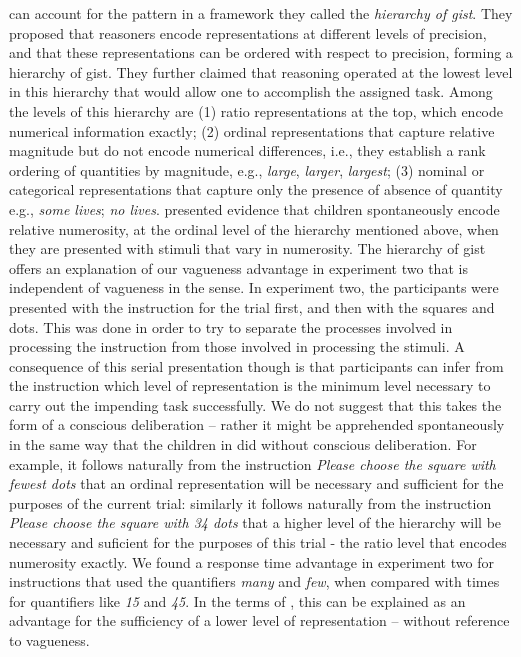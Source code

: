 \documentclass[doc,floatmark]{apa}
\begin{document}
\begin{seriate}
\item {} can account for the pattern in a framework they called the \emph{hierarchy of gist}. They proposed that reasoners encode representations at different levels of precision, and that these representations can be ordered with respect to precision, forming a hierarchy of gist. They further claimed that reasoning operated at the lowest level in this hierarchy that would allow one to accomplish the assigned task. Among the levels of this hierarchy are  (1) ratio representations at the top, which encode numerical information exactly; (2) ordinal representations that capture relative magnitude but do not encode numerical differences, i.e., they establish a rank ordering of quantities by magnitude, e.g., \emph{large}, \emph{larger}, \emph{largest}; (3) nominal or categorical representations that capture only the presence of absence of quantity e.g., \emph{some lives}; \emph{no lives}.  presented evidence that children spontaneously encode relative numerosity, at the ordinal level of the hierarchy mentioned above, when they are presented with stimuli that vary in numerosity. The hierarchy of gist offers an explanation of our vagueness advantage in experiment two that is independent of vagueness in the  sense. In experiment two, the participants were presented with the instruction for the trial first, and then with the squares and dots. This was done in order to try to separate the processes involved in processing the instruction from those involved in processing the stimuli. A consequence of this serial presentation though is that participants can infer from the instruction which level of representation is the minimum level necessary to carry out the impending task successfully. We do not suggest that this takes the form of a conscious deliberation -- rather it might be apprehended spontaneously in the same way that the children in  did without conscious deliberation. For example, it follows naturally from the instruction \emph{Please choose the square with fewest dots} that an ordinal representation will be necessary and sufficient for the purposes of the current trial: similarly it follows naturally from the instruction \emph{Please choose the square with 34 dots} that a higher level of the hierarchy will be necessary and suficient for the purposes of this trial - the ratio level that encodes numerosity exactly. We found a response time advantage in experiment two for instructions that used the quantifiers \emph{many} and \emph{few}, when compared with times for quantifiers like \emph{15} and \emph{45}. In the terms of , this can be explained as an advantage for the sufficiency of a lower level of representation -- without reference to vagueness.


\end{seriate}
\end{document}
